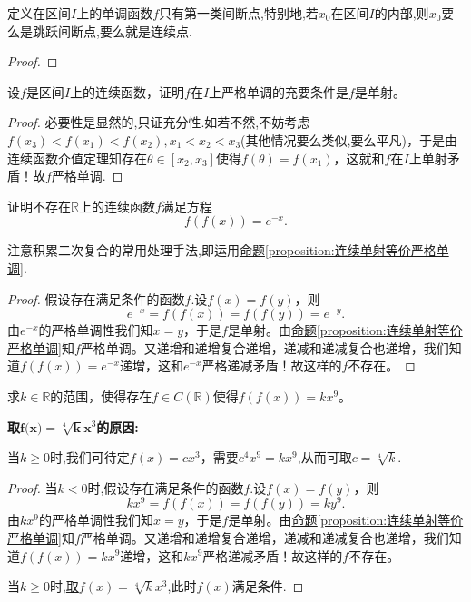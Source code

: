 \documentclass[../../main.tex]{subfiles}%
\begin{document}
\begin{proposition}\label{proposition:单调函数只有第一类间断点}
定义在区间$I$上的单调函数$f$只有第一类间断点,特别地,若$x_0$在区间$I$的内部,则$x_0$要么是跳跃间断点,要么就是连续点.
\end{proposition}
\begin{proof}

\end{proof}

\begin{proposition}[连续单射等价严格单调]\label{proposition:连续单射等价严格单调}
设\(f\)是区间\(I\)上的连续函数，证明\(f\)在\(I\)上严格单调的充要条件是\(f\)是单射。
\end{proposition}
\begin{proof}
必要性是显然的,只证充分性.如若不然,不妨考虑\(f(x_3)<f(x_1)<f(x_2),x_1<x_2<x_3\)(其他情况要么类似,要么平凡)，于是由连续函数介值定理知存在\(\theta\in[x_2,x_3]\)使得\(f(\theta)=f(x_1)\)，这就和\(f\)在\(I\)上单射矛盾！故\(f\)严格单调.
\end{proof}

\begin{example}
证明不存在\(\mathbb{R}\)上的连续函数\(f\)满足方程
\[
f(f(x)) = e^{-x}.
\]
\end{example}
\begin{note}
注意积累二次复合的常用处理手法,即运用\hyperref[proposition:连续单射等价严格单调]{命题\ref{proposition:连续单射等价严格单调}}.
\end{note}
\begin{proof}
假设存在满足条件的函数$f$.设\(f(x)=f(y)\)，则
\[
e^{-x}=f(f(x)) = f(f(y)) = e^{-y}.
\]
由\(e^{-x}\)的严格单调性我们知\(x = y\)，于是\(f\)是单射。由\hyperref[proposition:连续单射等价严格单调]{命题\ref{proposition:连续单射等价严格单调}}知\(f\)严格单调。又递增和递增复合递增，递减和递减复合也递增，我们知道\(f(f(x)) = e^{-x}\)递增，这和\(e^{-x}\)严格递减矛盾！故这样的\(f\)不存在。
\end{proof}

\begin{example}
求\(k\in\mathbb{R}\)的范围，使得存在\(f\in C(\mathbb{R})\)使得\(f(f(x)) = kx^{9}\)。
\end{example}
\begin{note}
\hypertarget{取这个函数的原因}{\textbf{取$\boldsymbol{f}\mathbb{(}\boldsymbol{x}\mathbb{)}=\sqrt[4]{\boldsymbol{k}}\boldsymbol{x}^{3}$的原因:}}当\(k\geqslant0\)时,我们可待定\(f(x)=cx^{3}\)，需要\(c^{4}x^{9}=kx^{9}\),从而可取\(c = \sqrt[4]{k}\).
\end{note}
\begin{proof}
当$k<0$时,假设存在满足条件的函数$f$.设\(f(x)=f(y)\)，则
\[
kx^{9}=f(f(x)) = f(f(y)) = ky^{9}.
\]
由\(kx^{9}\)的严格单调性我们知\(x = y\)，于是\(f\)是单射。由\hyperref[proposition:连续单射等价严格单调]{命题\ref{proposition:连续单射等价严格单调}}知\(f\)严格单调。又递增和递增复合递增，递减和递减复合也递增，我们知道\(f(f(x)) = kx^{9}\)递增，这和\(kx^{9}\)严格递减矛盾！故这样的\(f\)不存在。

当\(k\geqslant0\)时,\hyperlink{取这个函数的原因}{取$f(x)=\sqrt[4]{k}x^3$},此时$f(x)$满足条件.
\end{proof}
\end{document}
